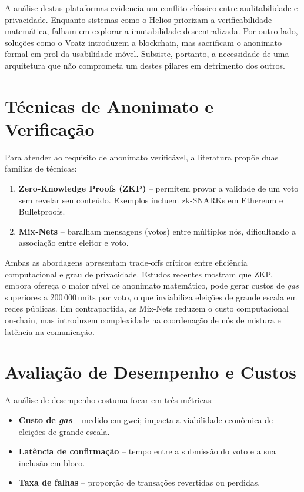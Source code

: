 A análise destas plataformas evidencia um conflito clássico entre auditabilidade e privacidade. Enquanto sistemas como o Helios priorizam a verificabilidade matemática, falham em explorar a imutabilidade descentralizada. Por outro lado, soluções como o Voatz introduzem a blockchain, mas sacrificam o anonimato formal em prol da usabilidade móvel. Subsiste, portanto, a necessidade de uma arquitetura que não comprometa um destes pilares em detrimento dos outros.

\section{Técnicas de Anonimato e Verificação}
Para atender ao requisito de anonimato verificável, a literatura propõe duas famílias de técnicas:
\begin{enumerate}
    \item \textbf{Zero‑Knowledge Proofs (ZKP)} – permitem provar a validade de um voto sem revelar seu conteúdo. Exemplos incluem zk‑SNARKs em Ethereum\cite{alvi_dvtchain_2022} e Bulletproofs\cite{hajian_berenjestanaki_blockchain-based_2024}.
    \item \textbf{Mix‑Nets}\cite{hajian_berenjestanaki_blockchain-based_2024, vanheck2007} – baralham mensagens (votos) entre m{\'u}ltiplos n{\'o}s, dificultando a associa{\c{c}}{\~a}o entre eleitor e voto.
\end{enumerate}

Ambas as abordagens apresentam trade‑offs críticos entre eficiência computacional e grau de privacidade. Estudos recentes\cite{hajian_berenjestanaki_blockchain-based_2024} mostram que ZKP, embora ofereça o maior nível de anonimato matemático, pode gerar custos de \textit{gas} superiores a 200 000 units por voto, o que inviabiliza eleições de grande escala em redes públicas. Em contrapartida, as Mix-Nets reduzem o custo computacional on-chain, mas introduzem complexidade na coordenação de nós de mistura e latência na comunicação.

\section{Avaliação de Desempenho e Custos}
A análise de desempenho costuma focar em três métricas:
\begin{itemize}
    \item \textbf{Custo de \textit{gas}} – medido em gwei; impacta a viabilidade econômica de eleições de grande escala.
    \item \textbf{Latência de confirmação}\cite{alvi_dvtchain_2022} – tempo entre a submissão do voto e a sua inclusão em bloco.
    \item \textbf{Taxa de falhas}\cite{alvi_dvtchain_2022} – proporção de transações revertidas ou perdidas.
\end{itemize}

